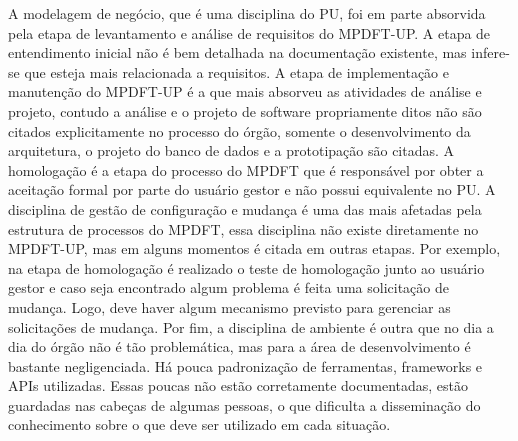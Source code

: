 \documentclass[
	article,			%
	11pt,				%
	oneside,			%
	a4paper,			%
	english,			%
	brazil,				%
	sumario=tradicional
	]{abntex2}
\begin{document}
\begin{table}[htb]
\end{table}

A modelagem de negócio, que é uma disciplina do PU, foi em parte absorvida
pela etapa de levantamento e análise de requisitos do MPDFT-UP. A etapa de
entendimento inicial não é bem detalhada na documentação existente, mas
infere-se que esteja mais relacionada a requisitos. A etapa de implementação e
manutenção do MPDFT-UP é a que mais absorveu as atividades de análise e projeto,
contudo a análise e o projeto de software propriamente ditos não são citados
explicitamente no processo do órgão, somente o desenvolvimento da arquitetura, o
projeto do banco de dados e a prototipação são citadas. A homologação é a etapa
do processo do MPDFT que é responsável por obter a aceitação formal por parte do
usuário gestor e não possui equivalente no PU. A disciplina de gestão de
configuração e mudança é uma das mais afetadas pela estrutura de processos do
MPDFT, essa disciplina não existe diretamente no MPDFT-UP, mas em alguns
momentos é citada em outras etapas. Por exemplo, na etapa de homologação é
realizado o teste de homologação junto ao usuário gestor e caso seja encontrado
algum problema é feita uma solicitação de mudança. Logo, deve haver algum
mecanismo previsto para gerenciar as solicitações de mudança. Por fim, a
disciplina de ambiente é outra que no dia a dia do órgão não é tão problemática,
mas para a área de desenvolvimento é bastante negligenciada. Há pouca
padronização de ferramentas, frameworks e APIs utilizadas. Essas poucas não
estão corretamente documentadas, estão guardadas nas cabeças de algumas pessoas,
o que dificulta a disseminação do conhecimento sobre o que deve ser utilizado em
 cada situação.
\end{document}

